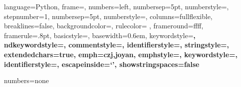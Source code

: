 

\usepackage{listings} %



\lstset %
{language=Python,
frame=\leftline\shadowbox,
numbers=left,
numbersep=5pt,
numberstyle=\ttfamily\footnotesize\color{gray},
stepnumber=1,
numbersep=5pt,
numberstyle=\color[RGB]{80,192,192},
columns=fullflexible,
breaklines=false,  %
backgroundcolor=\color{black!10!white},
rulecolor= \color{gray},
frameround=ffff,
framerule=.8pt,  %
basicstyle=\linespread{1.1}\ttfamily\footnotesize, %
basewidth=0.6em,
keywordstyle=\ttfamily\bf\color{colorKeyword},
ndkeywordstyle=\ttfamily\bf\color{colorNdkeyword},
commentstyle=\color{colorComment},
identifierstyle=\ttfamily\color{colorIdentifier}\bfseries,
stringstyle=\color{colorString}\ttfamily,
extendedchars=true,
emph={czj,joyan},
emphstyle=\color{blue}\bfseries,
keywordstyle=\color{blue}\bfseries,
identifierstyle=\color{black}, %
escapeinside=`',
showstringspaces=false
}



 {numbers=none}



